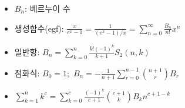 \begin{itemize}[noitemsep]
    \item $B_n$: 베르누이 수
    \item 생성함수(egf): $\frac{x}{e^x-1}=\frac{1}{(e^x-1)/x}=\sum_{n=0}^{\infty}\frac{B_n}{n!}x^n$
    \item 일반항: $B_n=\sum_{k=0}^{n}\frac{k!(-1)^k}{k+1}S_2(n, k)$
    \item 점화식: $B_0=1;$ $B_n=-\frac{1}{n+1}\sum_{r=0}^{n-1} \binom{n+1}{r}B_r$
    \item $\sum_{k=1}^{n} k^c=\sum_{k=0}^c \frac{(-1)^k}{c+1}\binom{c+1}{k}B_kn^{c+1-k}$
\end{itemize}